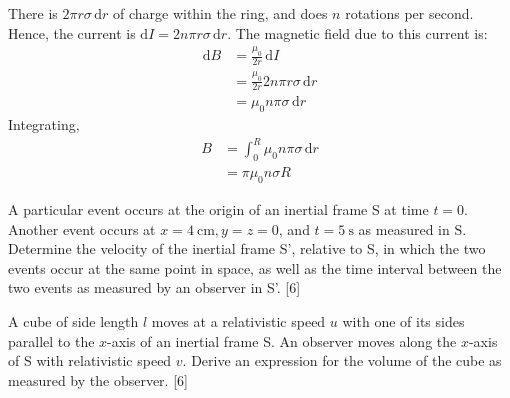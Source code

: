 \begin{solution}
\begin{subsolution}
\begin{center}
\begin{tikzpicture}[x=0.75pt,y=0.75pt,yscale=-1.2,xscale=1.2]
            
            \end{tikzpicture}
            
        \end{center}
        There is $2\pi r \sigma\,\mathrm{d}r$ of charge within the ring, and does $n$ rotations per second. Hence, the current is $\mathrm{d}I=2n\pi r \sigma\,\mathrm{d}r$. The magnetic field due to this current is:
        \begin{align*}
            \mathrm{d}B&=\frac{\mu_0}{2r}\,\mathrm{d}I\\
            &=\frac{\mu_0}{2r}2n\pi r \sigma\,\mathrm{d}r\\
            &=\mu_0 n\pi \sigma\,\mathrm{d}r
        \end{align*}
        Integrating,
        \begin{align*}
            B&=\int_{0}^{R}\mu_0 n\pi \sigma\,\mathrm{d}r\\
            &=\boxed{\pi\mu_0 n\sigma R}
        \end{align*}
    \end{subsolution}
\end{solution}

\begin{problem}
    \begin{subproblem}
        A particular event occurs at the origin of an inertial frame S at time $t=0$. Another event occurs at $x=\qty{4}{\cm}, y=z=0$, and $t=\qty{5}{\s}$ as measured in $\mathrm{S} .$ Determine the velocity of the inertial frame S', relative to S, in which the two events occur at the same point in space, as well as the time interval between the two events as measured by an observer in S'.
    \hfill{[6]}\end{subproblem}
    \begin{subproblem}
        A cube of side length $l$ moves at a relativistic speed $u$ with one of its sides parallel to the $x$-axis of an inertial frame S. An observer moves along the $x$-axis of S with relativistic speed $v$. Derive an expression for the volume of the cube as measured by the observer.
    \hfill{[6]}\end{subproblem}
\end{problem}

